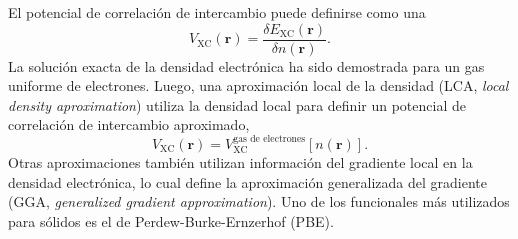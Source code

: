 El potencial de correlación de intercambio puede definirse como una 
\begin{equation}
    V_{\text{XC}}(\mathbf{r}) = \frac{\delta E_{\text{XC}}(\mathbf{r})}{\delta n(\mathbf{r})}.
\end{equation}
La solución exacta de la densidad electrónica ha sido demostrada para un gas 
uniforme de electrones. Luego, una aproximación local de la densidad (LCA,
\textit{local density aproximation}) utiliza la densidad local para definir 
un potencial de correlación de intercambio aproximado,
\begin{equation}
    V_{\text{XC}}(\mathbf{r}) = V_{\text{XC}}^{\text{gas de electrones}}[n(\mathbf{r})].
\end{equation}
Otras aproximaciones también utilizan información del gradiente local en 
la densidad electrónica, lo cual define la aproximación generalizada del 
gradiente (GGA, \textit{generalized gradient approximation}). Uno de los
funcionales más utilizados para sólidos es el de Perdew-Burke-Ernzerhof (PBE).
